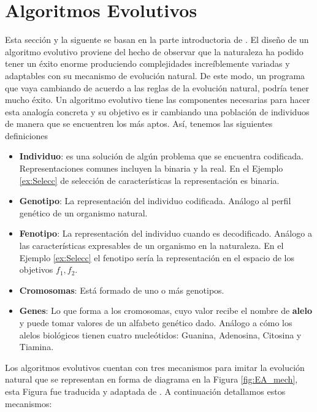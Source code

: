 \section{Algoritmos Evolutivos} \label{sec:AE}

Esta sección y la siguente se basan en la parte introductoria de \cite{EAforMOEAs}. El diseño de un algoritmo evolutivo proviene del hecho de observar  que la naturaleza ha podido tener un éxito enorme produciendo complejidades increíblemente variadas y adaptables con su mecanismo de evolución natural. De este modo, un programa que vaya cambiando de acuerdo a las reglas de la evolución natural, podría tener mucho éxito. Un algoritmo evolutivo tiene las componentes necesarias para hacer esta analogía concreta y su objetivo es ir cambiando una población de individuos de manera que se encuentren los más aptos. Así, tenemos las siguientes definiciones

\begin{itemize}
    \item \textbf{Individuo}: es una solución de algún problema que se encuentra codificada. Representaciones comunes incluyen la binaria y la real. En el Ejemplo \ref{ex:Selecc} de selección de características  la representación es binaria.
    \item \textbf{Genotipo}: La representación del individuo codificada. Análogo al perfil genético de un organismo natural. 
    \item \textbf{Fenotipo}: La representación del individuo cuando es decodificado. Análogo a las características expresables de un organismo en la naturaleza. En el Ejemplo \ref{ex:Selecc} el fenotipo sería la representación en el espacio de los objetivos $f_1, f_2$.
    \item \textbf{Cromosomas}: Está formado de uno o más genotipos.
    \item \textbf{Genes}: Lo que forma a los cromosomas, cuyo valor recibe el nombre de \textbf{alelo} y puede tomar valores de un alfabeto genético dado. Análogo a cómo los alelos biológicos tienen cuatro nucleótidos: Guanina, Adenosina, Citosina y Tiamina. 
\end{itemize}

Los algoritmos evolutivos cuentan con tres mecanismos para imitar la evolución natural que se representan en forma de diagrama en la Figura \ref{fig:EA_mech}, esta Figura fue traducida y adaptada de \cite{coelloEvolutionaryAlgorithmsSolving}. A continuación detallamos estos mecanismos: 

